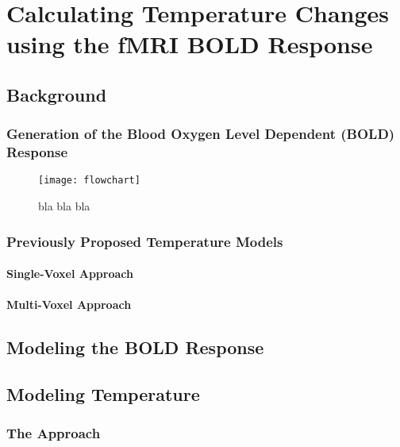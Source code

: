 \chapter{Calculating Temperature Changes using the fMRI BOLD Response}

\section{Background}
  \subsection{Generation of the {B}lood {O}xygen {L}evel {D}ependent ({BOLD}) Response}
    \begin{figure}
      \begin{center}
        \texttt{[image: flowchart]}
        \caption[Generation of the fMRI BOLD Response]{\label{fig:flowchart} bla bla bla}
      \end{center}
    \end{figure}
  \subsection{Previously Proposed Temperature Models}
    \subsubsection{Single-Voxel Approach}
    \subsubsection{Multi-Voxel Approach}
  


\section{Modeling the BOLD Response}

\section{Modeling Temperature}
  \subsection{The Approach}
